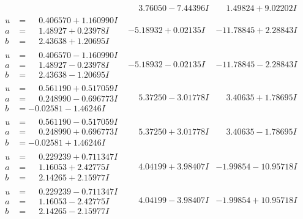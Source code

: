 \documentclass[1p]{elsarticle_modified}
\theoremstyle{definition}
\begin{document}
$$\begin{array}{c|c|c}
 & \phantom{-}3.76050 - 7.44396 I & \phantom{-}1.49824 + 9.02202 I \\ \hline\begin{aligned}
u &= \phantom{-}0.406570 + 1.160990 I \\
a &= \phantom{-}1.48927 + 0.23978 I \\
b &= \phantom{-}2.43638 + 1.20695 I\end{aligned}
 & -5.18932 + 0.02135 I & -11.78845 + 2.28843 I \\ \hline\begin{aligned}
u &= \phantom{-}0.406570 - 1.160990 I \\
a &= \phantom{-}1.48927 - 0.23978 I \\
b &= \phantom{-}2.43638 - 1.20695 I\end{aligned}
 & -5.18932 - 0.02135 I & -11.78845 - 2.28843 I \\ \hline\begin{aligned}
u &= \phantom{-}0.561190 + 0.517059 I \\
a &= \phantom{-}0.248990 - 0.696773 I \\
b &= -0.02581 - 1.46246 I\end{aligned}
 & \phantom{-}5.37250 - 3.01778 I & \phantom{-}3.40635 + 1.78695 I \\ \hline\begin{aligned}
u &= \phantom{-}0.561190 - 0.517059 I \\
a &= \phantom{-}0.248990 + 0.696773 I \\
b &= -0.02581 + 1.46246 I\end{aligned}
 & \phantom{-}5.37250 + 3.01778 I & \phantom{-}3.40635 - 1.78695 I \\ \hline\begin{aligned}
u &= \phantom{-}0.229239 + 0.711347 I \\
a &= \phantom{-}1.16053 + 2.42775 I \\
b &= \phantom{-}2.14265 + 2.15977 I\end{aligned}
 & \phantom{-}4.04199 + 3.98407 I & -1.99854 - 10.95718 I \\ \hline\begin{aligned}
u &= \phantom{-}0.229239 - 0.711347 I \\
a &= \phantom{-}1.16053 - 2.42775 I \\
b &= \phantom{-}2.14265 - 2.15977 I\end{aligned}
 & \phantom{-}4.04199 - 3.98407 I & -1.99854 + 10.95718 I \\ \hline\begin{aligned}

\end{aligned}
\end{array}$$
\end{document}
